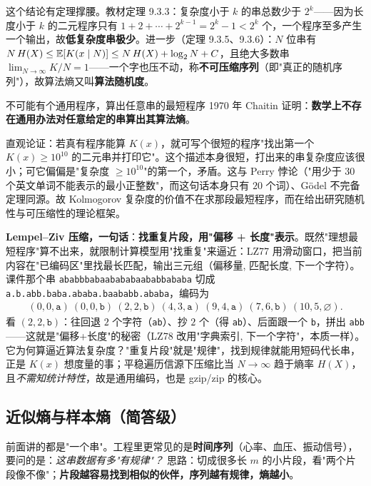 这个结论有定理撑腰。教材定理 9.3.3：复杂度小于 $k$ 的串总数少于 $2^k$——因为长度小于 $k$ 的二元程序只有 $1+2+\cdots+2^{k-1}=2^k-1<2^k$ 个，一个程序至多产生一个输出，故\textbf{低复杂度串极少}。进一步（定理 9.3.5、9.3.6）：$N$ 位串有 $N\,H(X)\le\operatorname{\mathbb{E}}[K(x\mid N)]\le N\,H(X)+\log_{2} N+C$，且绝大多数串 $\lim_{N\to\infty}K/N=1$——一个字也压不动，称\textbf{不可压缩序列}（即"真正的随机序列"），故算法熵又叫\textbf{算法随机度}。

\begin{qa}{不可能有个通用程序，算出任意串的最短程序}
1970 年 Chaitin 证明：\textbf{数学上不存在通用办法对任意给定的串算出其算法熵}。

直观论证：若真有程序能算 $K(x)$，就可写个很短的程序"找出第一个 $K(x)\ge10^{10}$ 的二元串并打印它"。这个描述本身很短，打出来的串复杂度应该很小；可它偏偏是"复杂度 $\ge10^{10}$"的第一个，矛盾。这与 Perry 悖论（"用少于 $30$ 个英文单词不能表示的最小正整数"，而这句话本身只有 $20$ 个词）、Gödel 不完备定理同源。故 Kolmogorov 复杂度的价值不在求那段最短程序，而在给出研究随机性与可压缩性的理论框架。
\end{qa}

\textbf{Lempel--Ziv 压缩，一句话}：\textbf{找重复片段，用"偏移 + 长度"表示}。既然"理想最短程序"算不出来，就限制计算模型用"找重复"来逼近：LZ77 用滑动窗口，把当前内容在"已编码区"里找最长匹配，输出三元组（偏移量, 匹配长度, 下一个字符）。课件那个串 \texttt{ababbbabaabababaababbababa} 切成 \texttt{a.b.abb.baba.ababa.baababb.ababa}，编码为
\begin{align*}
(0,0,\texttt{a})\ (0,0,\texttt{b})\ (2,2,\texttt{b})\ (4,3,\texttt{a})\ (9,4,\texttt{a})\ (7,6,\texttt{b})\ (10,5,\varnothing).
\end{align*}
看 $(2,2,\texttt{b})$：往回退 $2$ 个字符（\texttt{ab}）、抄 $2$ 个（得 \texttt{ab}）、后面跟一个 \texttt{b}，拼出 \texttt{abb}——这就是"偏移+长度"的秘密（LZ78 改用"字典索引, 下一个字符"，本质一样）。它为何算逼近算法复杂度？"重复片段"就是"规律"，找到规律就能用短码代长串，正是 $K(x)$ 想度量的事；平稳遍历信源下压缩比当 $N\to\infty$ 趋于熵率 $H(X)$，且\emph{不需知统计特性}，故是通用编码，也是 gzip/zip 的核心。

\subsection{近似熵与样本熵（简答级）}

前面讲的都是"一个串"。工程里更常见的是\textbf{时间序列}（心率、血压、振动信号），要问的是：\emph{这串数据有多"有规律"？} 思路：切成很多长 $m$ 的小片段，看"两个片段像不像"；\textbf{片段越容易找到相似的伙伴，序列越有规律，熵越小}。

